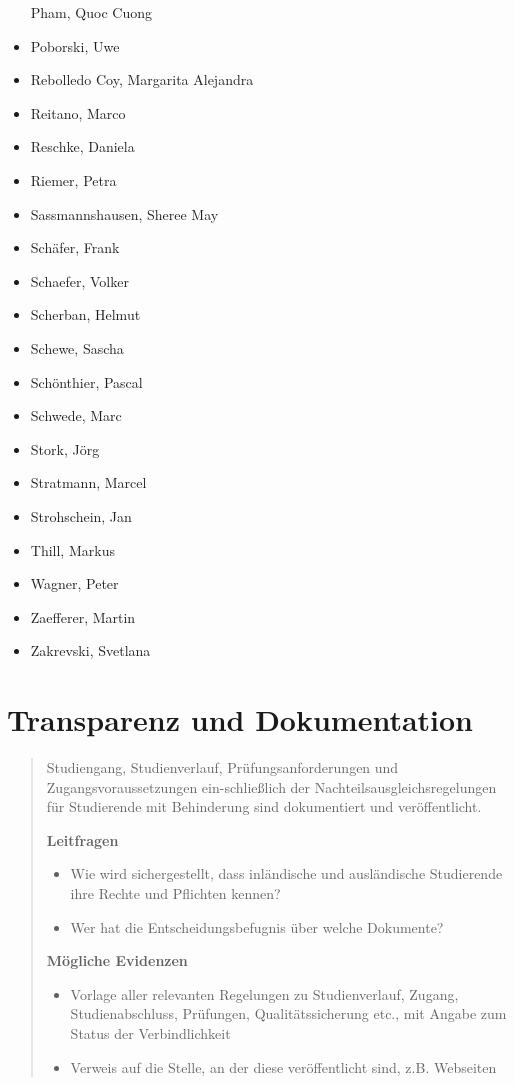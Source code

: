 \begin{itemize}
  Pham, Quoc Cuong
\item
  Poborski, Uwe
\item
  Rebolledo Coy, Margarita Alejandra
\item
  Reitano, Marco
\item
  Reschke, Daniela
\item
  Riemer, Petra
\item
  Sassmannshausen, Sheree May
\item
  Schäfer, Frank
\item
  Schaefer, Volker
\item
  Scherban, Helmut
\item
  Schewe, Sascha
\item
  Schönthier, Pascal
\item
  Schwede, Marc
\item
  Stork, Jörg
\item
  Stratmann, Marcel
\item
  Strohschein, Jan
\item
  Thill, Markus
\item
  Wagner, Peter
\item
  Zaefferer, Martin
\item
  Zakrevski, Svetlana
\end{itemize}

\chapter{Transparenz und
Dokumentation}\label{transparenz-und-dokumentation}

\begin{quote}
Studiengang, Studienverlauf, Prüfungsanforderungen und
Zugangsvoraussetzungen ein-schließlich der Nachteilsausgleichsregelungen
für Studierende mit Behinderung sind dokumentiert und veröffentlicht.

\textbf{Leitfragen}

\begin{itemize}
\item
  Wie wird sichergestellt, dass inländische und ausländische Studierende
  ihre Rechte und Pflichten kennen?
\item
  Wer hat die Entscheidungsbefugnis über welche Dokumente?
\end{itemize}

\textbf{Mögliche Evidenzen}

\begin{itemize}
\item
  Vorlage aller relevanten Regelungen zu Studienverlauf, Zugang,
  Studienabschluss, Prüfungen, Qualitätssicherung etc., mit Angabe zum
  Status der Verbindlichkeit
\item
  Verweis auf die Stelle, an der diese veröffentlicht sind, z.B.
  Webseiten
\end{itemize}
\end{quote}

